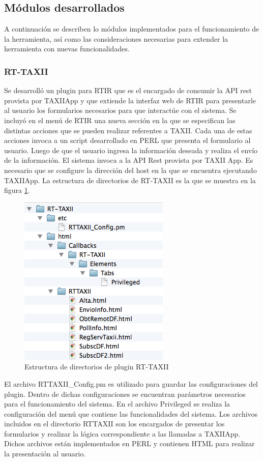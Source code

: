 \subsection{Módulos desarrollados}
A continuación se describen lo módulos implementados para el funcionamiento de la herramienta, así como las consideraciones necesarias para extender la herramienta con nuevas funcionalidades.

\subsubsection{RT-TAXII}
Se desarrolló un plugin para RTIR que es el encargado de consumir la API rest provista por TAXIIApp y que extiende la interfaz web de RTIR para presentarle al usuario los formularios necesarios para que interactúe con el sistema.
Se incluyó en el menú de RTIR una nueva sección en la que se especifican las distintas acciones que se pueden realizar referentes a TAXII.
Cada una de estas acciones invoca a un script desarrollado en PERL que presenta el formulario al usuario.
Luego de que el usuario ingresa la información deseada y realiza el envío de la información. El sistema invoca a la API Rest provista por TAXII App.
Es necesario que se configure la dirección del host en la que se encuentra ejecutando TAXIIApp.
La estructura de directorios de RT-TAXII es la que se muestra en la figura \ref{fig.rt_taxii}.\\

\begin{figure}[h!]
	\centering
	\includegraphics{imagenes/RT-TAXII.png}
	\caption{Estructura de directorios de plugin RT-TAXII}
	\label{fig.rt_taxii}
\end{figure}
	\bigskip
El archivo RTTAXII\_Config.pm es utilizado para guardar las configuraciones del plugin. Dentro de dichas configuraciones se encuentran parámetros necesarios para el funcionamiento del sistema.
En el archivo Privileged se realiza la configuración del menú que contiene las funcionalidades del sistema.
Los archivos incluidos en el directorio RTTAXII son los encargados de presentar los formularios y realizar la lógica correspondiente a las llamadas a TAXIIApp. Dichos archivos están implementados en PERL y contienen HTML para realizar la presentación al usuario.\\

